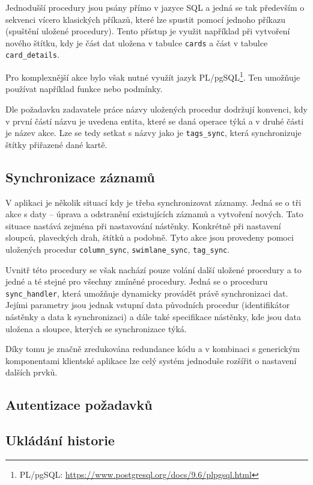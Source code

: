 Jednodušší procedury jsou psány přímo v jazyce SQL a jedná se tak především o sekvenci vícero klasických příkazů, které lze spustit pomocí jednoho příkazu (spuštění uložené procedury). Tento přístup je využit například při vytvoření nového štítku, kdy je část dat uložena v tabulce \texttt{cards} a část v tabulce \texttt{card\_details}.

Pro komplexnější akce bylo však nutné využít jazyk PL/pgSQL\footnote{PL/pgSQL: \url{https://www.postgresql.org/docs/9.6/plpgsql.html}}. Ten umožňuje používat například funkce nebo podmínky.

Dle požadavku zadavatele práce názvy uložených procedur dodržují konvenci, kdy v první částí názvu je uvedena entita, které se daná operace týká a v druhé části je název akce. Lze se tedy setkat s názvy jako je \texttt{tags\_sync}, která synchronizuje štítky přiřazené dané kartě. 


\subsection{Synchronizace záznamů}
V aplikaci je několik situací kdy je třeba synchronizovat záznamy. Jedná se o tři akce s daty -- úprava a odstranění existujících záznamů a vytvoření nových. Tato situace nastává zejména při nastavování nástěnky. Konkrétně při nastavení sloupců, plaveckých drah, štítků a podobně. Tyto akce jsou provedeny pomoci uložených procedur \texttt{column\_sync}, \texttt{swimlane\_sync}, \texttt{tag\_sync}.

Uvnitř této procedury se však nachází pouze volání další uložené procedury a to jedné a té stejné pro všechny zmíněné procedury. Jedná se o proceduru \texttt{sync\_handler}, která umožňuje dynamicky provádět právě synchronizaci dat. Jejími parametry jsou jednak vstupní data původních procedur (identifikátor nástěnky a data k synchronizaci) a dále také specifikace nástěnky, kde jsou data uložena a sloupce, kterých se synchronizace týká.

Díky tomu je značně zredukována redundance kódu a v kombinaci s generickým komponentami klientské aplikace lze celý systém jednoduše rozšířit o nastavení dalších prvků.


\subsection{Autentizace požadavků}
\blindtext


\subsection{Ukládání historie}
\blindtext


